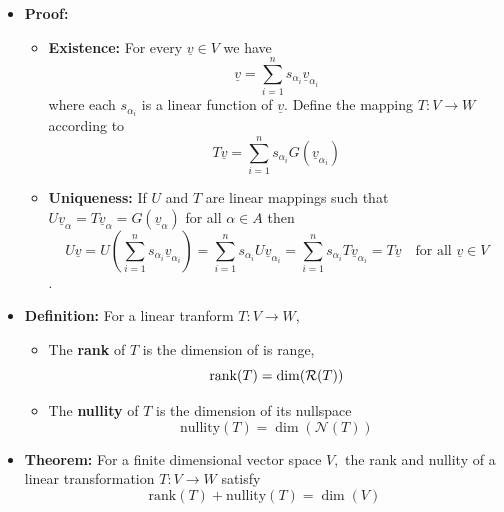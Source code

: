 \documentclass[11pt,twoside]{report}
\newcommand{\vecnot}{\underline}
\newcommand{\Rank}{\mathrm{rank}}
\newcommand{\Nullity}{\mathrm{nullity}}
\begin{document}
\begin{itemize}
\item \textbf{Proof:} 

\begin{itemize}
\item \textbf{Existence:} For every $\vecnot{v} \in V$ we have
\[
\vecnot{v} = \sum_{i=1}^n s_{\alpha_i} \vecnot{v}_{\alpha_i}
\]
where each $s_{\alpha_i}$ is a linear function of $ \vecnot{v} $. Define the mapping $T \colon V \to W$ according to %
\[
T \vecnot{v} = \sum_{i=1}^n s_{\alpha_i} G( \vecnot{v}_{\alpha_i}) 
\]


\item \textbf{Uniqueness:} If $U$ and $T$ are linear mappings such that $U \vecnot{v}_{\alpha}= T \vecnot{v}_{\alpha}  =  G(\vecnot{v}_{\alpha})$ for all $\alpha \in A$ then 
\[
 U \vecnot{v} =U  \left( \sum_{i=1}^n s_{\alpha_i} \vecnot{v}_{\alpha_i} \right) =\sum_{i=1}^n s_{\alpha_i} U \vecnot{v}_{\alpha_i}  =    \sum_{i=1}^n s_{\alpha_i} T  \vecnot{v}_{\alpha_i}  = T \vecnot{v} \quad \text{for all $\vecnot{v} \in V$}
 \]. 




\end{itemize}

\item \textbf{Definition:}  For a linear tranform $T \colon V \to W$, 
\begin{itemize}
\item The \textbf{rank} of $T$ is the dimension of  is  range, 
\[
\operatorname{\mathrm{rank}}(T)  = \dim( \mathcal{R}(T)) 
\]
\item The  \textbf{nullity} of $T$ is the dimension of its nullspace 
\[
\Nullity (T)  = \dim( \mathcal{N}(T)) 
\]

\end{itemize}


\item \textbf{Theorem:} 
For a finite dimensional vector space $V,$  the rank and nullity of a linear transformation $T \colon V  \to  W$ satisfy 
\begin{equation*}
\Rank (T) + \Nullity (T) = \dim (V)
\end{equation*}



\end{itemize}
\end{document}
